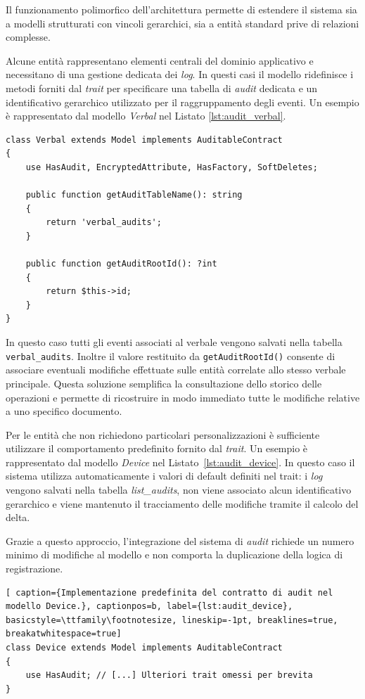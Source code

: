 Il funzionamento polimorfico dell'architettura permette di estendere il sistema sia a modelli strutturati con vincoli gerarchici, sia a entità standard prive di relazioni complesse.

Alcune entità rappresentano elementi centrali del dominio applicativo e necessitano di una gestione dedicata dei \textit{log}. In questi casi il modello ridefinisce i metodi forniti dal \textit{trait} per specificare una tabella di \textit{audit} dedicata e un identificativo gerarchico utilizzato per il raggruppamento degli eventi. Un esempio è rappresentato dal modello \textit{Verbal} nel Listato \ref{lst:audit_verbal}.
\begin{lstlisting}[float=t, caption={Personalizzazione del contratto di audit nel modello Verbal.}, captionpos=b, label={lst:audit_verbal}, basicstyle=\ttfamily\footnotesize, lineskip=-1pt, breaklines=true, breakatwhitespace=true]
class Verbal extends Model implements AuditableContract
{
	use HasAudit, EncryptedAttribute, HasFactory, SoftDeletes;
	
	public function getAuditTableName(): string
	{
		return 'verbal_audits';
	}
	
	public function getAuditRootId(): ?int
	{
		return $this->id;
	}
}
\end{lstlisting}
In questo caso tutti gli eventi associati al verbale vengono salvati nella tabella \texttt{verbal\_audits}. Inoltre il valore restituito da \texttt{getAuditRootId()} consente di associare eventuali modifiche effettuate sulle entità correlate allo stesso verbale principale. Questa soluzione semplifica la consultazione dello storico delle operazioni e permette di ricostruire in modo immediato tutte le modifiche relative a uno specifico documento.

Per le entità che non richiedono particolari personalizzazioni è sufficiente utilizzare il comportamento predefinito fornito dal \textit{trait}. Un esempio è rappresentato dal modello \textit{Device} nel Listato~\ref{lst:audit_device}. In questo caso il sistema utilizza automaticamente i valori di default definiti nel trait: i \textit{log} vengono salvati nella tabella \textit{list\_audits}, non viene associato alcun identificativo gerarchico e viene mantenuto il tracciamento delle modifiche tramite il calcolo del delta.

Grazie a questo approccio, l’integrazione del sistema di \textit{audit} richiede un numero minimo di modifiche al modello e non comporta la duplicazione della logica di registrazione.
\clearpage
\begin{lstlisting}[ caption={Implementazione predefinita del contratto di audit nel modello Device.}, captionpos=b, label={lst:audit_device}, basicstyle=\ttfamily\footnotesize, lineskip=-1pt, breaklines=true, breakatwhitespace=true]
class Device extends Model implements AuditableContract
{
	use HasAudit; // [...] Ulteriori trait omessi per brevita
}
\end{lstlisting}